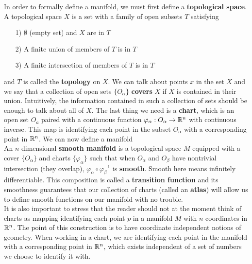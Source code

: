  In order to formally define a manifold, we must first define a \textbf{topological space}.  
A topological space $X$ is a set with a family of open subsets $T$ satisfying 
 \begin{enumerate}
 	\item[1)] $\emptyset$ (empty set) and $X$ are in $T$
 	\item[2)] A finite union of members of $T$ is in $T$
 	\item[3)] A finite intersection of members of $T$ is in $T$
 \end{enumerate}
 and $T$ is called the \textbf{topology} on $X$.  We can talk about points $x$ in the set $X$ and we say that a collection of open sets $\{O_\alpha \}$ \textbf{covers} $X$ if $X$ is contained in their union.  Intuitively, the information contained in such a collection of sets should be enough to talk about all of $X$.  The last thing we need is a \textbf{chart}, which is an open set $O_a$ paired with a continuous function $\varphi_\alpha: O_\alpha \to \mathbb{R}^n$ with continuous inverse.  This map is identifying each point in the subset $O_\alpha$ with a corresponding point in $\mathbb{R}^n$.  We can now define a manifold\\

  An $n$-dimensional \textbf{smooth manifold} is a topological space $M$ equipped with a cover $\{O_\alpha\}$ and charts $\{\varphi_\alpha\}$ such that when $O_\alpha$ and $O_\beta$ have nontrivial intersection (they overlap), $\varphi_\alpha \circ \varphi_\beta^{-1}$ is \textbf{smooth}.  Smooth here means infinitely differentiable.  This composition is called a \textbf{transition function} and its smoothness guarantees that our collection of charts (called an \textbf{atlas}) will allow us to define smooth functions on our manifold with no trouble. \\
  
  It is also important to stress that the reader should not at the moment think of charts as mapping identifying each point $p$ in a manifold $M$ with $n$ coordinates in $\mathbb{R}^n$.  The point of this construction is to have coordinate independent notions of geometry.  When working in a chart, we are identifying each point in the manifold with a corresponding point in $\mathbb{R}^n$, which exists independent of a set of numbers we choose to identify it with.\\
 
